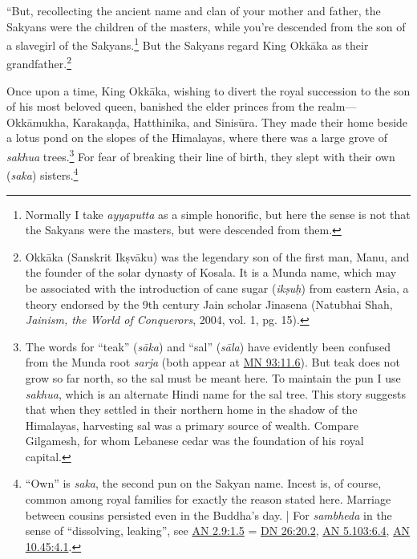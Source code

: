 \documentclass[12pt,openany]{book}%
\begin{document}
“But, recollecting the ancient name and clan of your mother and father, the Sakyans were the children of the masters, while you’re descended from the son of a slavegirl of the Sakyans.\footnote{Normally I take \textit{ayyaputta} as a simple honorific, but here the sense is not that the Sakyans were the masters, but were descended from them. } But the Sakyans regard King \textsanskrit{Okkāka} as their grandfather.\footnote{\textsanskrit{Okkāka} (Sanskrit \textsanskrit{Ikṣvāku}) was the legendary son of the first man, Manu, and the founder of the solar dynasty of Kosala. It is a Munda name, which may be associated with the introduction of cane sugar (\textit{\textsanskrit{ikṣuḥ}}) from eastern Asia, a theory endorsed by the 9th century Jain scholar Jinasena (Natubhai Shah, \emph{Jainism, the World of Conquerors}, 2004, vol. 1, pg. 15). } 

Once upon a time, King \textsanskrit{Okkāka}, wishing to divert the royal succession to the son of his most beloved queen, banished the elder princes from the realm—\textsanskrit{Okkāmukha}, \textsanskrit{Karakaṇḍa}, Hatthinika, and \textsanskrit{Sinisūra}. They made their home beside a lotus pond on the slopes of the Himalayas, where there was a large grove of \textit{sakhua} trees.\footnote{The words for “teak” (\textit{\textsanskrit{sāka}}) and “sal” (\textit{\textsanskrit{sāla}}) have evidently been confused from the Munda root \textit{sarja} (both appear at \href{https://suttacentral.net/mn93/en/sujato\#11.6}{MN 93:11.6}). But teak does not grow so far north, so the sal must be meant here. To maintain the pun I use \textit{sakhua}, which is an alternate Hindi name for the sal tree. This story suggests that when they settled in their northern home in the shadow of the Himalayas, harvesting sal was a primary source of wealth. Compare Gilgamesh, for whom Lebanese cedar was the foundation of his royal capital. } For fear of breaking their line of birth, they slept with their own (\textit{saka}) sisters.\footnote{“Own” is \textit{saka}, the second pun on the Sakyan name. Incest is, of course, common among royal families for exactly the reason stated here. Marriage between cousins persisted even in the Buddha’s day. | For \textit{sambheda} in the sense of “dissolving, leaking”, see \href{https://suttacentral.net/an2.9/en/sujato\#1.5}{AN 2.9:1.5} = \href{https://suttacentral.net/dn26/en/sujato\#20.2}{DN 26:20.2}, \href{https://suttacentral.net/an5.103/en/sujato\#6.4}{AN 5.103:6.4}, \href{https://suttacentral.net/an10.45/en/sujato\#4.1}{AN 10.45:4.1}. } 
\end{document}

